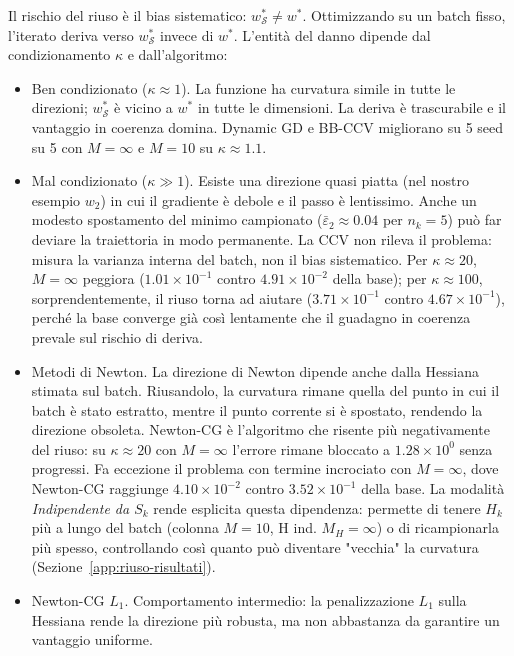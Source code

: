 Il rischio del riuso è il bias sistematico: $w^*_{\mathcal{S}}
\neq w^*$. Ottimizzando su un batch fisso, l'iterato deriva verso
$w^*_{\mathcal{S}}$ invece di $w^*$. L'entità del danno dipende dal
condizionamento $\kappa$ e dall'algoritmo:

\begin{itemize}
\item Ben condizionato ($\kappa \approx 1$). La funzione ha curvatura
  simile in tutte le direzioni; $w^*_{\mathcal{S}}$ è vicino a $w^*$ in tutte
  le dimensioni. La deriva è trascurabile e il vantaggio in coerenza domina.
  Dynamic GD e BB-CCV migliorano su 5 seed su 5 con $M=\infty$ e $M=10$ su
  $\kappa \approx 1.1$.
\item Mal condizionato ($\kappa \gg 1$). Esiste una direzione quasi
  piatta (nel nostro esempio $w_2$) in cui il gradiente è debole e il passo
  è lentissimo. Anche un modesto spostamento del minimo campionato
  ($\bar\varepsilon_2 \approx 0.04$ per $n_k=5$) può far deviare la
  traiettoria in modo permanente. La CCV non rileva il problema: misura la
  varianza interna del batch, non il bias sistematico. Per $\kappa \approx 20$,
  $M=\infty$ peggiora ($1.01\times10^{-1}$ contro $4.91\times10^{-2}$ della
  base); per $\kappa \approx 100$, sorprendentemente, il riuso torna ad
  aiutare ($3.71\times10^{-1}$ contro $4.67\times10^{-1}$), perché la base
  converge già così lentamente che il guadagno in coerenza prevale sul rischio
  di deriva.
\item Metodi di Newton. La direzione di Newton dipende anche dalla
  Hessiana stimata sul batch. Riusandolo, la curvatura rimane quella del punto
  in cui il batch è stato estratto, mentre il punto corrente si è spostato,
  rendendo la direzione obsoleta. Newton-CG è l'algoritmo che risente più
  negativamente del riuso: su $\kappa \approx 20$ con $M=\infty$ l'errore
  rimane bloccato a $1.28\times10^0$ senza progressi. Fa eccezione il problema
  con termine incrociato con $M=\infty$, dove Newton-CG raggiunge
  $4.10\times10^{-2}$ contro $3.52\times10^{-1}$ della base. La modalità
  \emph{Indipendente da $S_k$} rende esplicita questa dipendenza: permette di
  tenere $H_k$ più a lungo del batch (colonna $M{=}10$, H ind. $M_H{=}\infty$)
  o di ricampionarla più spesso, controllando così quanto può diventare
  "vecchia" la curvatura (Sezione~\ref{app:riuso-risultati}).
\item Newton-CG $L_1$. Comportamento intermedio: la penalizzazione
  $L_1$ sulla Hessiana rende la direzione più robusta, ma non abbastanza da
  garantire un vantaggio uniforme.
\end{itemize}

